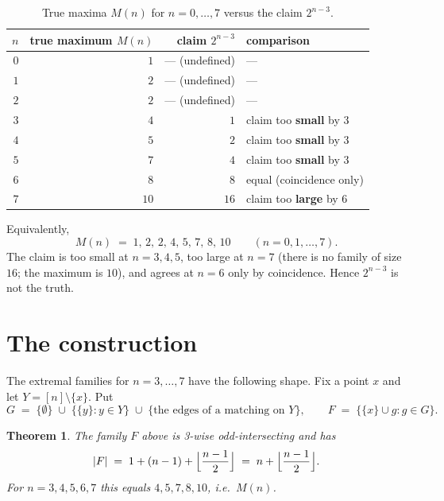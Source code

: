 \documentclass[11pt]{article}
\newtheorem{theorem}{Theorem}
\theoremstyle{definition}
\theoremstyle{remark}
\begin{document}
\begin{table}[h]
\centering
\begin{tabular}{r r r l}
\toprule
$n$ & true maximum $M(n)$ & claim $2^{n-3}$ & comparison \\
\midrule
$0$ & $1$ & --- (undefined) & --- \\
$1$ & $2$ & --- (undefined) & --- \\
$2$ & $2$ & --- (undefined) & --- \\
$3$ & $4$ & $1$  & claim too \textbf{small} by $3$ \\
$4$ & $5$ & $2$  & claim too \textbf{small} by $3$ \\
$5$ & $7$ & $4$  & claim too \textbf{small} by $3$ \\
$6$ & $8$ & $8$  & equal (coincidence only) \\
$7$ & $10$& $16$ & claim too \textbf{large} by $6$ \\
\bottomrule
\end{tabular}
\caption{True maxima $M(n)$ for $n = 0, \dots, 7$ versus the claim $2^{n-3}$.}
\end{table}

Equivalently,
\[
M(n) \;=\; 1,\, 2,\, 2,\, 4,\, 5,\, 7,\, 8,\, 10
\qquad (n = 0, 1, \dots, 7).
\]
The claim is too small at $n = 3, 4, 5$, too large at $n = 7$ (there is no
family of size $16$; the maximum is $10$), and agrees at $n = 6$ only by
coincidence. Hence $2^{n-3}$ is not the truth.

\section{The construction}

The extremal families for $n = 3, \dots, 7$ have the following shape. Fix a
point $x$ and let $Y = [n] \setminus \{x\}$. Put
\[
G \;=\; \{\emptyset\} \;\cup\; \bigl\{\{y\} : y \in Y\bigr\} \;\cup\;
\bigl\{\text{the edges of a matching on } Y\bigr\},
\qquad
F \;=\; \bigl\{\{x\} \cup g : g \in G\bigr\}.
\]

\begin{theorem}\label{thm:construction}
The family $F$ above is 3-wise odd-intersecting and has
\[
|F| \;=\; 1 + (n-1) + \Bigl\lfloor \frac{n-1}{2} \Bigr\rfloor
       \;=\; n + \Bigl\lfloor \frac{n-1}{2} \Bigr\rfloor .
\]
For $n = 3, 4, 5, 6, 7$ this equals $4, 5, 7, 8, 10$, i.e.\ $M(n)$.
\end{theorem}
\end{document}
